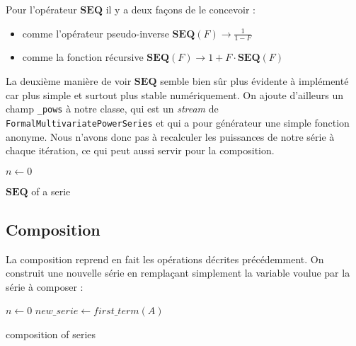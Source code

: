 \documentclass[12pt]{report}
\begin{document}
Pour l'opérateur $\mathbf{SEQ}$ il y a deux façons de le concevoir :
\begin{itemize}
\item comme l'opérateur pseudo-inverse $\mathbf{SEQ} (F) \longrightarrow
  \frac{1}{1-F}$
\item comme la fonction récursive $\mathbf{SEQ} (F) \longrightarrow 1 + F \cdot
  \mathbf{SEQ} (F)$
\end{itemize}
La deuxième manière de voir $\mathbf{SEQ}$ semble bien sûr plus évidente à
implémenté car plus simple et surtout plus stable numériquement.
On ajoute d'ailleurs un champ \verb|_pows| à notre classe, qui est un \emph{stream}
de \\ \verb|FormalMultivariatePowerSeries| et qui a pour générateur une simple
fonction anonyme. Nous n'avons donc pas à recalculer les puissances de notre
série à chaque itération, ce qui peut aussi servir pour la composition.

\begin{algorithm}
\DontPrintSemicolon
{}

\BlankLine
$n \leftarrow 0 $\;
\caption{$\mathbf{SEQ} $ of a serie}
\end{algorithm}

\subsection{Composition}
La composition reprend en fait les opérations décrites précédemment. On
construit une nouvelle série en remplaçant simplement la variable voulue par la
série à composer :

\begin{algorithm}
\DontPrintSemicolon
{}


\BlankLine
$n \leftarrow 0 $\;
$new\_serie \leftarrow first\_term(A) $\;
\caption{composition of series}
\end{algorithm}
\end{document}

